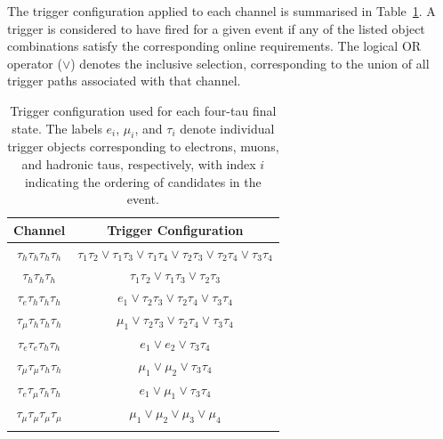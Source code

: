 The trigger configuration applied to each channel is summarised in Table~\ref{Table:Chapter6_TriggersPerChannel}. A trigger is considered to have fired for a given event if any of the listed object combinations satisfy the corresponding online requirements. The logical OR operator ($\lor$) denotes the inclusive selection, corresponding to the union of all trigger paths associated with that channel.

\begin{table}[!htbp]
\centering
\renewcommand{\arraystretch}{1.5}
\setlength{\tabcolsep}{12pt}
\begin{tabular}{cc}
\hline
Channel & Trigger Configuration \\ \hline 

$\tau_h\tau_h\tau_h\tau_h$ &  
$\tau_1\tau_2 \mathbin{\lor} \tau_1\tau_3 \mathbin{\lor} \tau_1\tau_4 \mathbin{\lor} \tau_2\tau_3 \mathbin{\lor} \tau_2\tau_4 \mathbin{\lor} \tau_3\tau_4$ \\ 
\arrayrulecolor{lightgray} \hline

$\tau_h\tau_h\tau_h$ &
$\tau_1\tau_2 \mathbin{\lor} \tau_1\tau_3 \mathbin{\lor} \tau_2\tau_3$ \\
\arrayrulecolor{lightgray} \hline

$\tau_e\tau_h\tau_h\tau_h$ &
$e_1 \mathbin{\lor} \tau_2\tau_3 \mathbin{\lor} \tau_2\tau_4 \mathbin{\lor} \tau_3\tau_4$ \\
\arrayrulecolor{lightgray} \hline

$\tau_\mu\tau_h\tau_h\tau_h$ &
$\mu_1 \mathbin{\lor} \tau_2\tau_3 \mathbin{\lor} \tau_2\tau_4 \mathbin{\lor} \tau_3\tau_4$ \\
\arrayrulecolor{lightgray} \hline

$\tau_e\tau_e\tau_h\tau_h$ &
$e_1 \mathbin{\lor} e_2 \mathbin{\lor} \tau_3\tau_4$ \\
\arrayrulecolor{lightgray} \hline

$\tau_\mu\tau_\mu\tau_h\tau_h$ &
$\mu_1 \mathbin{\lor} \mu_2 \mathbin{\lor} \tau_3\tau_4$ \\
\arrayrulecolor{lightgray} \hline

$\tau_e\tau_\mu\tau_h\tau_h$ &
$e_1 \mathbin{\lor} \mu_1 \mathbin{\lor} \tau_3\tau_4$ \\
\arrayrulecolor{lightgray} \hline

$\tau_\mu \tau_\mu \tau_\mu \tau_\mu$ &
$\mu_1 \mathbin{\lor} \mu_2 \mathbin{\lor} \mu_3 \mathbin{\lor} \mu_4$ \\
\arrayrulecolor{black} \hline

\end{tabular}
\caption[Trigger configuration used for each four-tau final state.]{Trigger configuration used for each four-tau final state. The labels $e_i$, $\mu_i$, and $\tau_i$ denote individual trigger objects corresponding to electrons, muons, and hadronic taus, respectively, with index $i$ indicating the ordering of candidates in the event.}
\label{Table:Chapter6_TriggersPerChannel}
\end{table}

